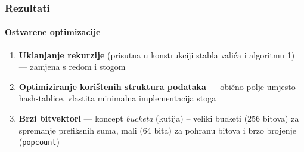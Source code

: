 \documentclass{beamer}
\begin{document}
    \begin{frame}
        \frametitle{Rezultati}
        \framesubtitle{Ostvarene optimizacije}

        \begin{enumerate}
            \item \textbf{Uklanjanje rekurzije} (prisutna u konstrukciji stabla valića i algoritmu 1) --- zamjena s redom i stogom
            \item \textbf{Optimiziranje korištenih struktura podataka} --- obično polje umjesto hash-tablice, vlastita minimalna implementacija stoga
            \item \textbf{Brzi bitvektori} --- koncept \textit{bucketa} (kutija) -- veliki bucketi (256 bitova) za spremanje prefiksnih suma, mali (64 bita) za pohranu bitova i brzo brojenje (\texttt{popcount})
        \end{enumerate}

    \end{frame}
\end{document}
